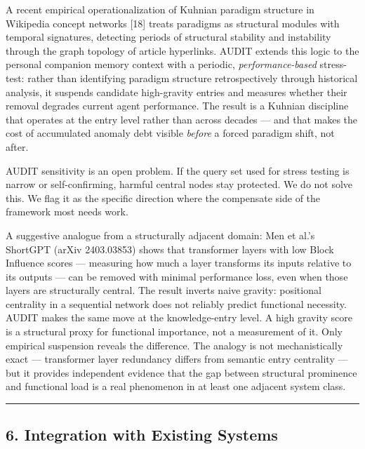 \documentclass[
  11pt,
]{article}
\begin{document}
A recent empirical operationalization of Kuhnian paradigm structure in
Wikipedia concept networks {[}18{]} treats paradigms as structural
modules with temporal signatures, detecting periods of structural
stability and instability through the graph topology of article
hyperlinks. AUDIT extends this logic to the personal companion memory
context with a periodic, \emph{performance-based} stress-test: rather
than identifying paradigm structure retrospectively through historical
analysis, it suspends candidate high-gravity entries and measures
whether their removal degrades current agent performance. The result is
a Kuhnian discipline that operates at the entry level rather than across
decades --- and that makes the cost of accumulated anomaly debt visible
\emph{before} a forced paradigm shift, not after.

AUDIT sensitivity is an open problem. If the query set used for stress
testing is narrow or self-confirming, harmful central nodes stay
protected. We do not solve this. We flag it as the specific direction
where the compensate side of the framework most needs work.

A suggestive analogue from a structurally adjacent domain: Men et al.'s
ShortGPT (arXiv 2403.03853) shows that transformer layers with low Block
Influence scores --- measuring how much a layer transforms its inputs
relative to its outputs --- can be removed with minimal performance
loss, even when those layers are structurally central. The result
inverts naive gravity: positional centrality in a sequential network
does not reliably predict functional necessity. AUDIT makes the same
move at the knowledge-entry level. A high gravity score is a structural
proxy for functional importance, not a measurement of it. Only empirical
suspension reveals the difference. The analogy is not mechanistically
exact --- transformer layer redundancy differs from semantic entry
centrality --- but it provides independent evidence that the gap between
structural prominence and functional load is a real phenomenon in at
least one adjacent system class.

\begin{center}\rule{0.5\linewidth}{0.5pt}\end{center}

\hypertarget{integration-with-existing-systems}{%
\subsection{6. Integration with Existing
Systems}\label{integration-with-existing-systems}}
\end{document}

